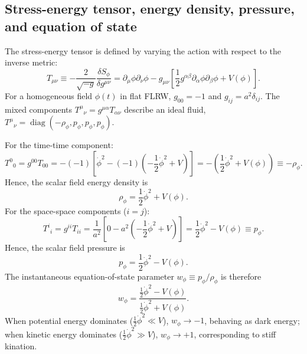 \documentclass[11pt]{article}
\begin{document}
\subsection{Stress-energy tensor, energy density, pressure, and equation of state}
The stress-energy tensor is defined by varying the action with respect to the inverse metric:
\begin{equation}
T_{\mu\nu} \equiv -\frac{2}{\sqrt{-g}}\frac{\delta S_\phi}{\delta g^{\mu\nu}} = \partial_\mu\phi\partial_\nu\phi - g_{\mu\nu}\left[ \frac{1}{2}g^{\alpha\beta}\partial_\alpha\phi\partial_\beta\phi + V(\phi) \right].
\end{equation}
For a homogeneous field $\phi(t)$ in flat FLRW, $g_{00} = -1$ and $g_{ij} = a^2\delta_{ij}$. The mixed components $T^\mu{}_\nu = g^{\mu\alpha}T_{\alpha\nu}$ describe an ideal fluid, $T^\mu{}_\nu = \operatorname{diag}(-\rho_\phi, p_\phi, p_\phi, p_\phi)$. 

For the time-time component:
\begin{equation}
T^0{}_0 = g^{00}T_{00} = -(-1)\left[ \dot\phi^2 - (-1)\left(-\frac{1}{2}\dot\phi^2 + V\right) \right] = -\left( \frac{1}{2}\dot\phi^2 + V(\phi) \right) \equiv -\rho_\phi.
\end{equation}
Hence, the scalar field energy density is
\begin{equation}
\boxed{\rho_\phi = \frac{1}{2}\dot\phi^2 + V(\phi)}.
\label{eq:rho_phi}
\end{equation}
For the space-space components ($i = j$):
\begin{equation}
T^i{}_i = g^{ii}T_{ii} = \frac{1}{a^2}\left[ 0 - a^2\left(-\frac{1}{2}\dot\phi^2 + V\right) \right] = \frac{1}{2}\dot\phi^2 - V(\phi) \equiv p_\phi.
\end{equation}
Hence, the scalar field pressure is
\begin{equation}
\boxed{p_\phi = \frac{1}{2}\dot\phi^2 - V(\phi)}.
\label{eq:p_phi}
\end{equation}
The instantaneous equation-of-state parameter $w_\phi \equiv p_\phi / \rho_\phi$ is therefore
\begin{equation}
\boxed{w_\phi = \frac{\frac{1}{2}\dot\phi^2 - V(\phi)}{\frac{1}{2}\dot\phi^2 + V(\phi)}}.
\label{eq:w_phi}
\end{equation}
When potential energy dominates ($\frac{1}{2}\dot\phi^2 \ll V$), $w_\phi \to -1$, behaving as dark energy; when kinetic energy dominates ($\frac{1}{2}\dot\phi^2 \gg V$), $w_\phi \to +1$, corresponding to stiff kination.
\end{document}
